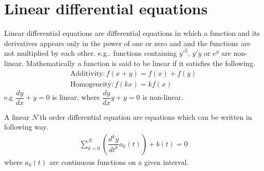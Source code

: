 \section{Linear differential equations}
Linear differential equations are differential equations in which a function and its derivatives appears only in the power of one or zero and  and the functions are not multiplied by each other. e.g.. functions containing $y'^2$, $y'y$ or $e^y$ are non-linear. Mathematically a function is said to be linear if it satisfies the following.
\begin{align*}
\text{Additivity}:
f(x+y)=f(x)+f(y)
\\
\text{Homogeneity}:
f(kx)=kf(x)
\end{align*}
e.g $\dfrac{dy}{dx}+y=0$ is linear, where $\dfrac{dy}{dx}y+y=0$ is non-linear.
\begin{tcolorbox}[colback=blue!5!white,colframe=blue!75!black,title=Definition: $N$'th order linear differential equation]
A linear $N$'th order differential equation are equations which can be written in following way.
\begin{align*}
\sum_{k=0}^{N}\left(\dfrac{d^ky}{dt^k}a_k(t)\right)+b(t)=0
\end{align*}
where $a_k(t)$ are continuous functions on a given interval.  
\end{tcolorbox}
